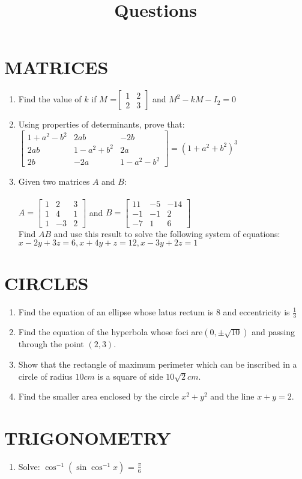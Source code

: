 \documentclass[12pt]{article}
\providecommand{\myvec}[1]{\ensuremath{\begin{bmatrix}#1\end{bmatrix}}}
\begin{document}
\section{MATRICES}
\begin{enumerate}
 \item Find the value of $ k $ if $M$ =$ \myvec {1 & 2 \\ 2 & 3 }$  and     $M^2 - kM - I_2 = 0 $
\item Using properties of determinants, prove that:\\

	$ \myvec  {1 + a^2 - b^2 & 2ab & -2b \\ 
 2ab & 1 - a^2 + b^2 & 2a \\
 2b & -2a & 1 - a^2 - b^2}
 = (1 + a^2 + b^2)^3 $
\item  Given two matrices $A$ and $B$:\\
\\
		\quad  $ A = \myvec{ 1 & 2 & 3 \\
1 & 4 & 1 \\
		1 & -3 &2}$ and \quad $ B = \myvec{ 11 & -5 & -14 \\
		-1 & -1 & 2 \\
		-7 & 1 & 6 }$\\

		Find $AB$ and use this result to solve the following system of equations:\\
$x - 2y + 3z = 6,	x + 4y + z = 12,	x - 3y + 2z = 1$
\end{enumerate}
		\section{CIRCLES}
		\begin{enumerate}
			\item Find the equation of an ellipse whose latus rectum is $8$ and eccentricity is $\frac {1}{3}$
			\item Find the equation of the hyperbola whose foci are$(0, \pm \sqrt{10})$ and passing through the point $(2, 3)$.
			\item Show that the rectangle of maximum perimeter which can be inscribed in a circle of radius $10 cm$ is a square of side $10\sqrt{2} cm$.
			\item Find the smaller area enclosed by the circle $x^2 + y^2$ and the line $x + y = 2$.
		\end{enumerate}
		\section{TRIGONOMETRY}
		\title{Questions}
		\begin{enumerate}
			\item Solve: $\cos^{-1}(\sin\cos^{-1} x)$ = $\frac{\pi}{6} $
		\end{enumerate}
\end{document}
